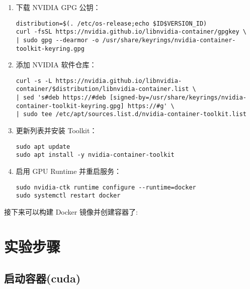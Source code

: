 \documentclass[UTF8]{ctexart}
\begin{document}
\begin{tcolorbox}[colback=gray!5!white, colframe=gray!40!black, title=\textbf{NVIDIA GPU 支持配置步骤}, breakable]
\begin{enumerate}[label={\textbf{步骤 \arabic*:}}, leftmargin=1.6cm, itemsep=0.6em]
    \item 下载 NVIDIA GPG 公钥：
\begin{verbatim}
distribution=$(. /etc/os-release;echo $ID$VERSION_ID)
curl -fsSL https://nvidia.github.io/libnvidia-container/gpgkey \
| sudo gpg --dearmor -o /usr/share/keyrings/nvidia-container-toolkit-keyring.gpg
\end{verbatim}

    \item 添加 NVIDIA 软件仓库：
\begin{verbatim}
curl -s -L https://nvidia.github.io/libnvidia-container/$distribution/libnvidia-container.list \
| sed 's#deb https://#deb [signed-by=/usr/share/keyrings/nvidia-container-toolkit-keyring.gpg] https://#g' \
| sudo tee /etc/apt/sources.list.d/nvidia-container-toolkit.list
\end{verbatim}

    \item 更新列表并安装 Toolkit：
\begin{verbatim}
sudo apt update
sudo apt install -y nvidia-container-toolkit
\end{verbatim}

    \item 启用 GPU Runtime 并重启服务：
\begin{verbatim}
sudo nvidia-ctk runtime configure --runtime=docker
sudo systemctl restart docker
\end{verbatim}
\end{enumerate}
\end{tcolorbox}


接下来可以构建 Docker 镜像并创建容器了:



\section{实验步骤}



\subsection{启动容器(cuda)}
\end{document}
